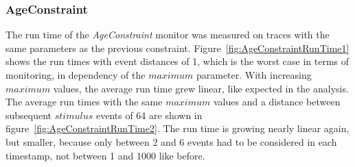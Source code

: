 \subsubsection{AgeConstraint}
The run time of the \textit{AgeConstraint} monitor was measured on traces with the same parameters as the previous constraint. Figure~\ref{fig:AgeConstraintRunTime1} shows the run times with event distances of 1, which is the worst case in terms of monitoring, in dependency of the $maximum$ parameter. With increasing $maximum$ values, the average run time grew linear, like expected in the analysis. The average run times with the same $maximum$ values and a distance between subsequent $stimulus$ events of 64 are shown in figure~\ref{fig:AgeConstraintRunTime2}. The run time is growing nearly linear again, but smaller, because only between 2 and 6 events had to be considered in each timestamp, not between 1 and 1000 like before.
